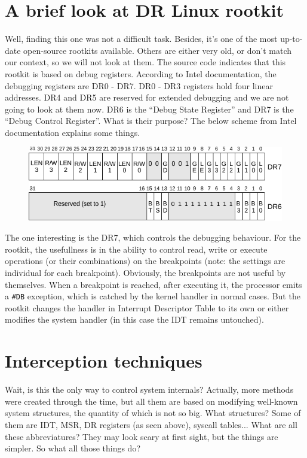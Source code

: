 \documentclass[12pt]{article}
\begin{document}
  \section{A brief look at DR Linux rootkit}
  
  Well, finding this one was not a difficult task. Besides, it's one of the
  most up-to-date open-source rootkits available. Others are either very old,
  or don't match our context, so we will not look at them. The source code
  indicates that this rootkit is based on debug registers. According to Intel
  documentation, the debugging registers are DR0 - DR7. DR0 - DR3 registers
  hold four linear addresses. DR4 and DR5 are reserved for extended debugging
  and we are not going to look at them now. DR6 is the ``Debug State
  Register'' and DR7 is the ``Debug Control Register''. What is their purpose?
  The below scheme from Intel documentation explains some things.
  \begin{figure}[h]
    \includegraphics[width=\linewidth, keepaspectratio]{dregs}
  \end{figure}
  The one interesting is the DR7, which controls the debugging behaviour. For
  the rootkit, the usefullness is in the ability to control read, write or
  execute operations (or their combinations) on the breakpoints (note: the
  settings are individual for each breakpoint). Obviously, the breakpoints are
  not useful by themselves. When a breakpoint is reached, after executing it,
  the processor emits a \verb!#DB! exception, which is catched by the kernel
  handler in normal cases. But the rootkit changes the handler in Interrupt
  Descriptor Table to its own or either modifies the system handler (in this
  case the IDT remains untouched).

  \section{Interception techniques}

  Wait, is this the only way to control system internals? Actually, more
  methods were created through the time, but all them are based on modifying
  well-known system structures, the quantity of which is not so big. What
  structures? Some of them are IDT, MSR, DR registers (as seen
  above), syscall tables... What are all these abbreviatures? They may look
  scary at first sight, but the things are simpler. So what all those things do?
\end{document}
